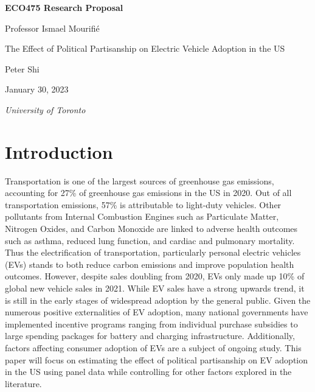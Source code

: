 \documentclass{article}
\begin{document}
\begin{titlepage}
\centering

{\LARGE\bfseries ECO475 Research Proposal}

\vspace{1cm}

Professor Ismael Mourifié

\vspace{1cm}

{\Large The Effect of Political Partisanship on Electric Vehicle Adoption in the US}

\vspace{2cm}

{\large Peter Shi}

January 30, 2023

\vfill

{\itshape University of Toronto}
\end{titlepage}

\newpage
\raggedright

\setlength{\parindent}{20pt}
\section{Introduction}

Transportation is one of the largest sources of greenhouse gas emissions, accounting for 27\% of greenhouse gas emissions in the US in 2020. Out of all transportation emissions, 57\% is attributable to light-duty vehicles. \autocite{EPA} Other pollutants from Internal Combustion Engines such as Particulate Matter, Nitrogen Oxides, and Carbon Monoxide are linked to adverse health outcomes such as asthma, reduced lung function, and cardiac and pulmonary mortality. \autocite{brugge_durant_rioux_2007} Thus the electrification of transportation, particularly personal electric vehicles (EVs) stands to both reduce carbon emissions and improve population health outcomes. However, despite sales doubling from 2020, EVs only made up 10\% of global new vehicle sales in 2021. \autocite{iea_2022} While EV sales have a strong upwards trend, it is still in the early stages of widespread adoption by the general public. Given the numerous positive externalities of EV adoption, many national governments have implemented incentive programs ranging from individual purchase subsidies to large spending packages for battery and charging infrastructure. \autocite{iea_2022} Additionally, factors affecting consumer adoption of EVs are a subject of ongoing study. This paper will focus on estimating the effect of political partisanship on EV adoption in the US using panel data while controlling for other factors explored in the literature.
\end{document}
